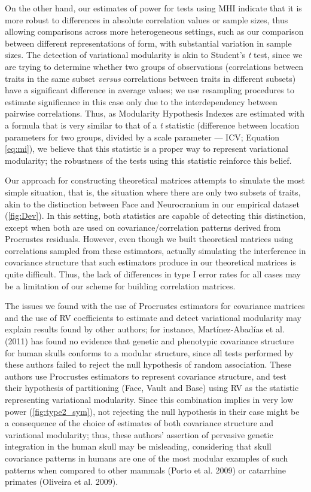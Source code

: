 \documentclass[12pt,]{article}
\begin{document}
On the other hand, our estimates of power for tests using MHI indicate
that it is more robust to differences in absolute correlation values or
sample sizes, thus allowing comparisons across more heterogeneous
settings, such as our comparison between different representations of
form, with substantial variation in sample sizes. The detection of
variational modularity is akin to Student's \emph{t} test, since we are
trying to determine whether two groups of observations (correlations
between traits in the same subset \emph{versus} correlations between
traits in different subsets) have a significant difference in average
values; we use resampling procedures to estimate significance in this
case only due to the interdependency between pairwise correlations.
Thus, as Modularity Hypothesis Indexes are estimated with a formula that
is very similar to that of a \emph{t} statistic (difference between
location parameters for two groups, divided by a scale parameter ---
ICV; Equation \ref{eq:mi}), we believe that this statistic is a proper
way to represent variational modularity; the robustness of the tests
using this statistic reinforce this belief.

Our approach for constructing theoretical matrices attempts to simulate
the most simple situation, that is, the situation where there are only
two subsets of traits, akin to the distinction between Face and
Neurocranium in our empirical dataset (\autoref{fig:Dev}). In this
setting, both statistics are capable of detecting this distinction,
except when both are used on covariance/correlation patterns derived
from Procrustes residuals. However, even though we built theoretical
matrices using correlations sampled from these estimators, actually
simulating the interference in covariance structure that such estimators
produce in our theoretical matrices is quite difficult. Thus, the lack
of differences in type I error rates for all cases may be a limitation
of our scheme for building correlation matrices.

The issues we found with the use of Procrustes estimators for covariance
matrices and the use of RV coefficients to estimate and detect
variational modularity may explain results found by other authors; for
instance, Martínez-Abadías et al. (2011) has found no evidence that
genetic and phenotypic covariance structure for human skulls conforms to
a modular structure, since all tests performed by these authors failed
to reject the null hypothesis of random association. These authors use
Procrustes estimators to represent covariance structure, and test their
hypothesis of partitioning (Face, Vault and Base) using RV as the
statistic representing variational modularity. Since this combination
implies in very low power (\autoref{fig:type2_sym}), not rejecting the
null hypothesis in their case might be a consequence of the choice of
estimates of both covariance structure and variational modularity; thus,
these authors' assertion of pervasive genetic integration in the human
skull may be misleading, considering that skull covariance patterns in
humans are one of the most modular examples of such patterns when
compared to other mammals (Porto et al. 2009) or catarrhine primates
(Oliveira et al. 2009).
\end{document}
